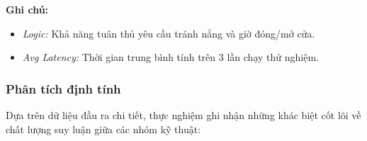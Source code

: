 \begin{table}[h!]
    \centering
    
    \caption{Bảng so sánh hiệu năng các kỹ thuật Prompt}
    \label{tab:prompt-comparison}

    \vspace{0.5em}
    \begin{flushleft}
        \textbf{Ghi chú:}
        \begin{itemize}
            \item \textit{Logic:} Khả năng tuân thủ yêu cầu tránh nắng và giờ đóng/mở cửa.
            \item \textit{Avg Latency:} Thời gian trung bình tính trên 3 lần chạy thử nghiệm.
        \end{itemize}
    \end{flushleft}
    
\end{table}

\subsubsection{Phân tích định tính}
Dựa trên dữ liệu đầu ra chi tiết, thực nghiệm ghi nhận những khác biệt cốt lõi về chất lượng suy luận giữa các nhóm kỹ thuật:

